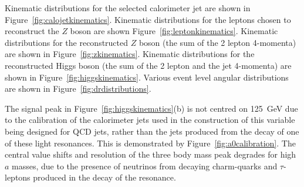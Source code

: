 \documentclass[NOTE, atlasdraft=true, texlive=2017, UKenglish]{\ATLASLATEXPATH atlasdoc}
\begin{document}

Kinematic distributions for the selected calorimeter jet are shown in Figure~\ref{fig:calojetkinematics}. Kinematic distributions for the leptons chosen to reconstruct the $Z$ boson are shown Figure~\ref{fig:leptonkinematics}. Kinematic distributions for the reconstructed $Z$ boson (the sum of the 2 lepton 4-momenta) are shown in Figure~\ref{fig:zkinematics}. Kinematic distributions for the reconstructed Higgs boson (the sum of the 2 lepton and the jet 4-momenta) are shown in Figure~\ref{fig:higgskinematics}. Various event level angular distributions are shown in Figure~\ref{fig:drdistributions}.

The signal peak in Figure~\ref{fig:higgskinematics}(b) is not centred on 125~GeV due to the calibration of the calorimeter jets used in the construction of this variable being designed for QCD jets, rather than the jets produced from the decay of one of these light resonances. This is demonstrated by Figure~\ref{fig:a0calibration}. The central value shifts and resolution of the three body mass peak degrades for high $a$ masses, due to the presence of neutrinos from decaying charm-quarks and $\tau$-leptons produced in the decay of the resonance.
\end{document}
